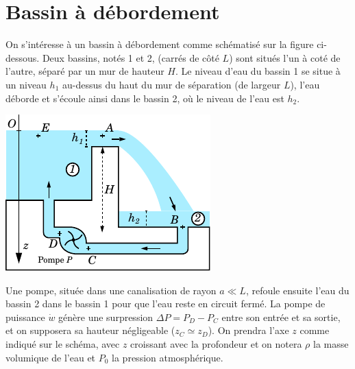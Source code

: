 \documentclass{report}
\begin{document}
\begin{itemize}
\end{itemize}

\newpage

\section*{Bassin à débordement}

On s'intéresse à un bassin à débordement comme schématisé sur la figure ci-dessous. Deux bassins, notés 1 et 2, (carrés de côté $L$) sont situés l'un à coté de l'autre, séparé par un mur de hauteur $H$. Le niveau d'eau du bassin 1 se situe à un niveau $h_1$ au-dessus du haut du mur de séparation (de largeur $L$), l'eau déborde et s'écoule ainsi dans le bassin 2, où le niveau de l'eau est $h_2$. 

\begin{center}
	\includegraphics[scale=1.6]{meca_flu8.pdf}
\end{center}

Une pompe, située dans une canalisation de rayon $a\ll L$, refoule ensuite l'eau du bassin 2 dans le bassin 1 pour que l'eau reste en circuit fermé. La pompe de puissance $\dot{w}$ génère une surpression $\Delta P=P_D-P_C$ entre son entrée et sa sortie, et on supposera sa hauteur négligeable ($z_C\simeq z_D$). On prendra l'axe $z$ comme indiqué sur le schéma, avec $z$ croissant avec la profondeur et on notera $\rho$ la masse volumique de l'eau et $P_0$ la pression atmosphérique.
\end{document}
